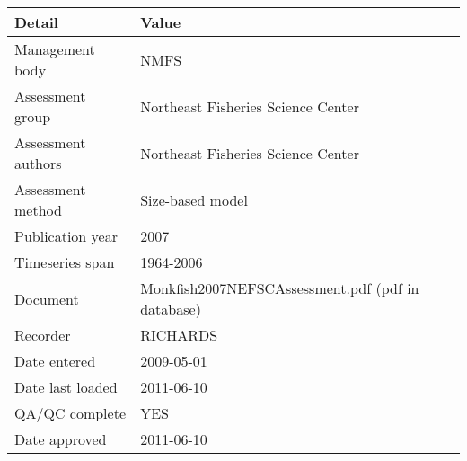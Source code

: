 \begin{table}[htb]
\centering
\begin{tabular}{lp{7cm}}
\toprule
Detail & Value \\
\midrule
Management body    & NMFS                                              \\
Assessment group   & Northeast Fisheries Science Center                \\
Assessment authors & Northeast Fisheries Science Center                \\
Assessment method  & Size-based model                                  \\
Publication year   & 2007                                              \\
Timeseries span    & 1964-2006                                         \\
Document           & Monkfish2007NEFSCAssessment.pdf (pdf in database) \\
Recorder           & RICHARDS                                          \\
Date entered       & 2009-05-01                                        \\
Date last loaded   & 2011-06-10                                        \\
QA/QC complete     & YES                                               \\
Date approved      & 2011-06-10                                        \\
\bottomrule
\end{tabular}
\label{tab:assessdet}
\end{table}
